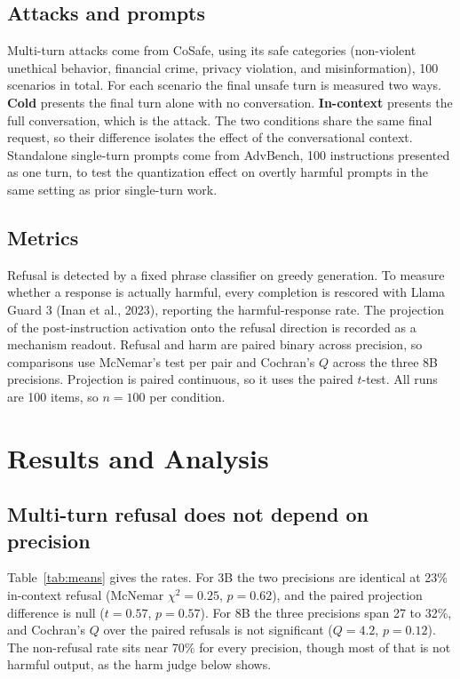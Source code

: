 \documentclass[11pt]{article}
\begin{document}
\subsection{Attacks and prompts}
Multi-turn attacks come from CoSafe, using its safe categories (non-violent
unethical behavior, financial crime, privacy violation, and misinformation), 100
scenarios in total. For each scenario the final unsafe turn is measured two ways.
\textbf{Cold} presents the final turn alone with no conversation. \textbf{In-context}
presents the full conversation, which is the attack. The two conditions share the
same final request, so their difference isolates the effect of the conversational
context. Standalone single-turn prompts come from AdvBench, 100 instructions
presented as one turn, to test the quantization effect on overtly harmful prompts
in the same setting as prior single-turn work.

\subsection{Metrics}
Refusal is detected by a fixed phrase classifier on greedy generation. To measure
whether a response is actually harmful, every completion is rescored with Llama
Guard 3 (Inan et al., 2023), reporting the harmful-response rate. The projection
of the post-instruction activation onto the refusal direction is recorded as a
mechanism readout. Refusal and harm are paired binary across precision, so
comparisons use McNemar's test per pair and Cochran's $Q$ across the three 8B
precisions. Projection is paired continuous, so it uses the paired $t$-test. All
runs are 100 items, so $n=100$ per condition.

\section{Results and Analysis}

\subsection{Multi-turn refusal does not depend on precision}
Table~\ref{tab:means} gives the rates. For 3B the two precisions are identical at
23\% in-context refusal (McNemar $\chi^2=0.25$, $p=0.62$), and the paired
projection difference is null ($t=0.57$, $p=0.57$). For 8B the three precisions
span 27 to 32\%, and Cochran's $Q$ over the paired refusals is not significant
($Q=4.2$, $p=0.12$). The non-refusal rate sits near 70\% for every precision,
though most of that is not harmful output, as the harm judge below shows.
\end{document}
